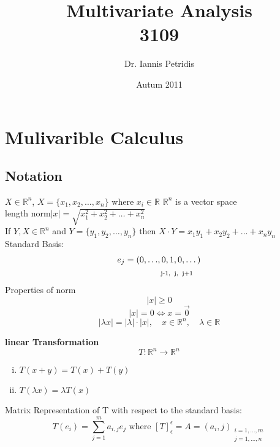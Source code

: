 \documentclass[12pt]{article}
\def\RR{\mathbb{R}}
\begin{document}
\title{Multivariate Analysis\\ 3109}
\author{Dr. Iannis Petridis}
\date{Autum 2011}
\maketitle

\tableofcontents
\setcounter{tocdepth}{4}
\newpage

\section{Mulivarible  Calculus}
\subsection{Notation}
$X\in\RR^{n}$, $ X=\{x_{1},x_{2},\dots,x_{n}\}$ where $x_{i}\in\RR$
$\RR^{n}$ is a vector space\\
length norm$|x|=\sqrt{x_1^2 + x_2^2 + \dots +x_n^2 }$\\
If $Y,X\in\RR^{n}$ and $ Y=\{y_{1},y_{2},\dots,y_{n}\}$ then $X \cdot Y=x_{1}y_{1}+ x_{2}y_{2} +\dots + x_{n}y_{n}$\\
Standard Basis:
\begin{align*}
  e_j=(0, \dots &,  0, 1, 0, \dots)\\
& \textrm{ \scriptsize j-1,\: j, \:j+1} 
\end{align*}
Properties of norm
\[|x|\geq0\]
\[|x|=0  \Leftrightarrow x=\vec{0}\]
\[| \lambda x| = | \lambda| \cdot |x| , \quad x \in \RR^n, \quad \lambda \in \RR \]

\textbf{linear Transformation}
\[T:\RR^{n}\rightarrow\RR^{n}\]
\begin{enumerate}[(i)]
\item $ T(x+y)=T(x) + T(y)$
\item $T(\lambda x) =\lambda T(x) $
\end{enumerate}
Matrix Representation of T with respect to the standard basis:\\
\[T(e_i)=\sum_{j=1}^{m}a_{i,j}e_j \textrm{ where } [T]_{\epsilon}^{\epsilon}=A=(a_i,j)_{\substack{i=1,\dots ,m \\ j=1,\dots ,n}}\]
\end{document}
